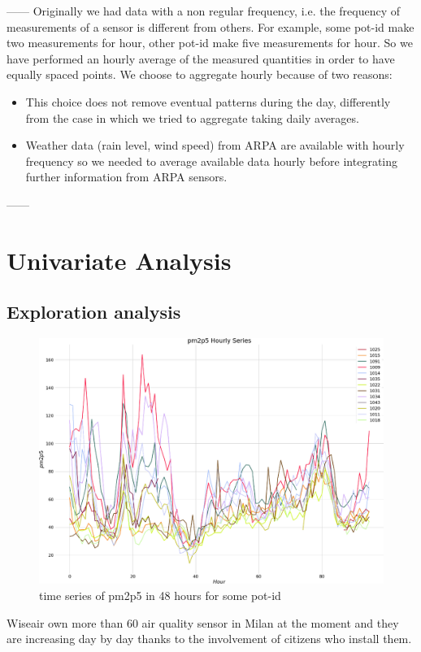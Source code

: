 \documentclass{article}
\begin{document}
------
Originally we had data with a non regular frequency, i.e. the frequency of measurements of a sensor 
is different from others. For example, some pot-id make two measurements for hour, other pot-id make 
five measurements for hour. So we have performed an hourly average of the measured quantities in order to have equally spaced points. We choose to aggregate hourly because of two reasons: 
\begin{itemize}
\item This choice does not remove eventual patterns during the day, differently from the case in which we tried to aggregate taking daily averages. 
\item Weather data (rain level, wind speed) from ARPA are available with hourly frequency so we needed to average 
available data hourly before integrating further information from ARPA sensors. 
\end{itemize}

------
\newpage
\section{\textbf{Univariate Analysis}}
\subsection{Exploration analysis}
\begin{figure}[h!]
    \centering
    \includegraphics[scale=0.3]{plotDati.png}
    \caption{time series of pm2p5 in 48 hours for some pot-id}
\end{figure}
Wiseair own more than 60 air quality sensor in Milan at the moment and they are increasing day by day thanks to the involvement of citizens who install them. 
\end{document}
